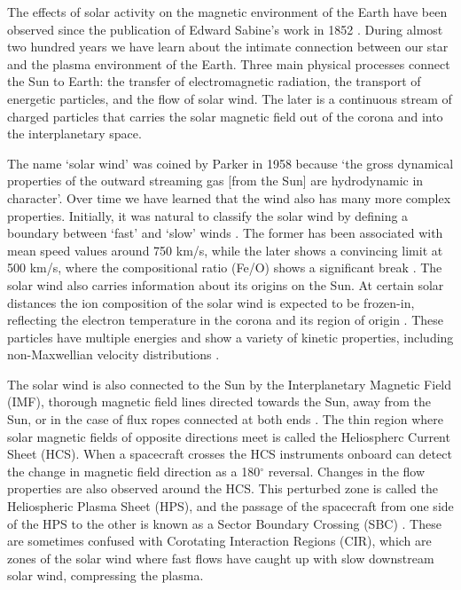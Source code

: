 The effects of solar activity on the magnetic environment of the Earth have been observed since the publication of Edward Sabine's work in 1852 \citep{Sabine1852}. During almost two hundred years we have learn about the intimate connection between our star and the plasma environment of the Earth. Three main physical processes connect the Sun to Earth: the transfer of electromagnetic radiation, the transport of energetic particles, and the flow of solar wind. The later is a continuous stream of charged particles that carries the solar magnetic field out of the corona and into the interplanetary space.

The name `solar wind' was coined by Parker in 1958 because `the gross dynamical properties of the outward streaming gas [from the Sun] are hydrodynamic in character'\citep{Parker1958}. Over time we have learned that the wind also has many more complex properties. Initially, it was natural to classify the solar wind by defining a boundary between `fast' and `slow' winds \citep{Habbal1997}. The former has been associated with mean speed values around 750 km/s, while the later shows a convincing limit at 500 km/s, where the compositional ratio (Fe/O) shows a significant break \citep{Feldman2005,Stakhiv2015}. The solar wind also carries information about its origins on the Sun. At certain solar distances the ion composition of the solar wind is expected to be frozen-in, reflecting the electron temperature in the corona and its region of origin \citep{Feldman2005,Zhao2009,Stakhiv2015}. These particles have multiple energies and show a variety of kinetic properties, including non-Maxwellian velocity distributions \citep{Pierrard2010,Matteini2012}.

The solar wind is also connected to the Sun by the Interplanetary Magnetic Field (IMF), thorough magnetic field lines directed towards the Sun, away from the Sun, or in the case of flux ropes connected at both ends \citep{Owens2016,Gosling2010}. The thin region where solar magnetic fields of opposite directions meet is called the Heliospherc Current Sheet (HCS). When a spacecraft crosses the HCS instruments onboard can detect the change in magnetic field direction as a 180$^\circ$ reversal. Changes in the flow properties are also observed around the HCS. This perturbed zone is called the Heliospheric Plasma Sheet (HPS), and the passage of the spacecraft from one side of the HPS to the other is known as a Sector Boundary Crossing (SBC) \citep{Winterhalter1994}. These are sometimes confused with Corotating Interaction Regions (CIR), which are zones of the solar wind where fast flows have caught up with slow downstream solar wind, compressing the plasma.

